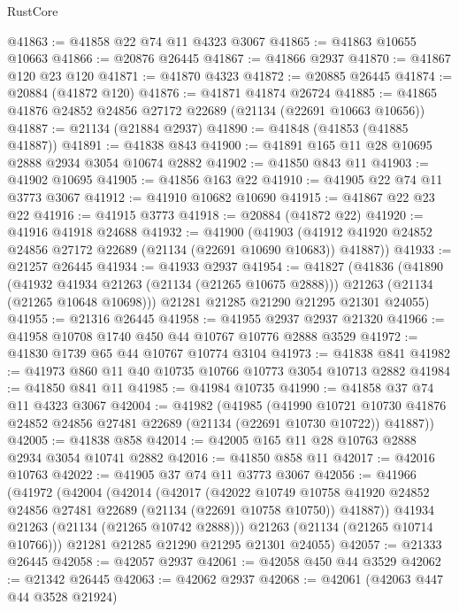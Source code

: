 \begin{lexlean}{RustCore}
\begin{coremodule}
@41863 := @41858 @22 @74 @11 @4323 @3067
@41865 := @41863 @10655 @10663
@41866 := @20876 @26445
@41867 := @41866 @2937
@41870 := @41867 @120 @23 @120
@41871 := @41870 @4323
@41872 := @20885 @26445
@41874 := @20884 (@41872 @120)
@41876 := @41871 @41874 @26724
@41885 := @41865 @41876 @24852 @24856 @27172 @22689 (@21134 (@22691 @10663 @10656))
@41887 := @21134 (@21884 @2937)
@41890 := @41848 (@41853 (@41885 @41887))
@41891 := @41838 @843
@41900 := @41891 @165 @11 @28 @10695 @2888 @2934 @3054 @10674 @2882
@41902 := @41850 @843 @11
@41903 := @41902 @10695
@41905 := @41856 @163 @22
@41910 := @41905 @22 @74 @11 @3773 @3067
@41912 := @41910 @10682 @10690
@41915 := @41867 @22 @23 @22
@41916 := @41915 @3773
@41918 := @20884 (@41872 @22)
@41920 := @41916 @41918 @24688
@41932 := @41900
    (@41903 (@41912 @41920 @24852 @24856 @27172 @22689 (@21134 (@22691 @10690 @10683)) @41887))
@41933 := @21257 @26445
@41934 := @41933 @2937
@41954 := @41827
    (@41836
      (@41890
        (@41932 @41934 @21263 (@21134 (@21265 @10675 @2888)))
        @21263
        (@21134 (@21265 @10648 @10698)))
      @21281
      @21285
      @21290
      @21295
      @21301
      @24055)
@41955 := @21316 @26445
@41958 := @41955 @2937 @2937 @21320
@41966 := @41958 @10708 @1740 @450 @44 @10767 @10776 @2888 @3529
@41972 := @41830 @1739 @65 @44 @10767 @10774 @3104
@41973 := @41838 @841
@41982 := @41973 @860 @11 @40 @10735 @10766 @10773 @3054 @10713 @2882
@41984 := @41850 @841 @11
@41985 := @41984 @10735
@41990 := @41858 @37 @74 @11 @4323 @3067
@42004 := @41982
    (@41985
      (@41990
        @10721
        @10730
        @41876
        @24852
        @24856
        @27481
        @22689
        (@21134 (@22691 @10730 @10722))
        @41887))
@42005 := @41838 @858
@42014 := @42005 @165 @11 @28 @10763 @2888 @2934 @3054 @10741 @2882
@42016 := @41850 @858 @11
@42017 := @42016 @10763
@42022 := @41905 @37 @74 @11 @3773 @3067
@42056 := @41966
    (@41972
      (@42004
        (@42014
          (@42017
            (@42022
              @10749
              @10758
              @41920
              @24852
              @24856
              @27481
              @22689
              (@21134 (@22691 @10758 @10750))
              @41887))
          @41934
          @21263
          (@21134 (@21265 @10742 @2888)))
        @21263
        (@21134 (@21265 @10714 @10766)))
      @21281
      @21285
      @21290
      @21295
      @21301
      @24055)
@42057 := @21333 @26445
@42058 := @42057 @2937
@42061 := @42058 @450 @44 @3529
@42062 := @21342 @26445
@42063 := @42062 @2937
@42068 := @42061 (@42063 @447 @44 @3528 @21924)

\end{coremodule}
\end{lexlean}
